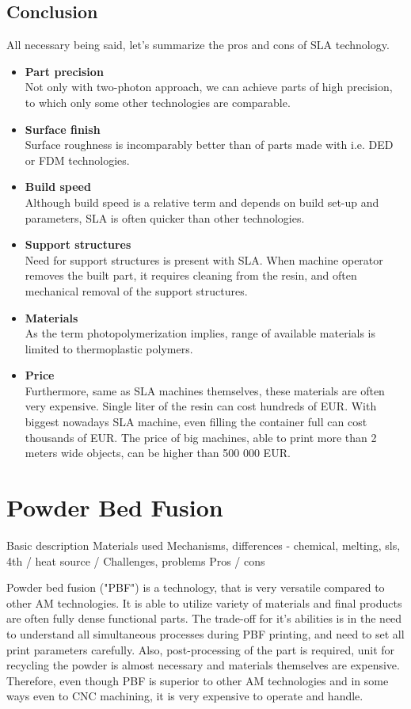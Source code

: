 \documentclass[a4paper, twoside, 11pt]{report}
\newcommand\pro{\item[$+$]}
\newcommand\con{\item[$-$]}
\begin{document}
\section{Conclusion}
All necessary being said, let's summarize the pros and cons of SLA technology.
%
\begin{itemize}
\pro \textbf{Part precision}\\
Not only with two-photon approach, we can achieve parts of high precision, to which only some other technologies are comparable.
\pro \textbf{Surface finish}\\
Surface roughness is incomparably better than of parts made with i.e. DED or FDM technologies.
\pro \textbf{Build speed}\\
Although build speed is a relative term and depends on build set-up and parameters, SLA is often quicker than other technologies.
\\[10pt]
\con \textbf{Support structures}\\
Need for support structures is present with SLA. When machine operator removes the built part, it requires cleaning from the resin, and often mechanical removal of the support structures.
\con \textbf{Materials}\\
As the term photopolymerization implies, range of available materials is limited to thermoplastic polymers.
\con \textbf{Price}\\
Furthermore, same as SLA machines themselves, these materials are often very expensive. Single liter of the resin can cost hundreds of EUR. With biggest nowadays SLA machine, even filling the container full can cost thousands of EUR. The price of big machines, able to print more than 2 meters wide objects, can be higher than 500 000 EUR.
\end{itemize}

\chapter{Powder Bed Fusion}
Basic description
Materials used
Mechanisms, differences - chemical, melting, sls, 4th / heat source / 
Challenges, problems
Pros / cons

Powder bed fusion ("PBF") is a technology, that is very versatile compared to other AM technologies. It is able to utilize variety of materials and final products are often fully dense functional parts. The trade-off for it's abilities is in the need to understand all simultaneous processes during PBF printing, and need to set all print parameters carefully. Also, post-processing of the part is required, unit for recycling the powder is almost necessary and materials themselves are expensive. Therefore, even though PBF is superior to other AM technologies and in some ways even to CNC machining, it is very expensive to operate and handle.
\end{document}
